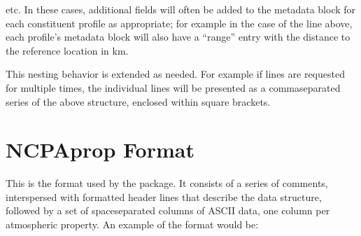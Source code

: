 \documentclass[letterpaper,10pt,english]{sphinxmanual}
\begin{document}
\begin{sphinxVerbatim}[commandchars=\\\{\}]
   
       
       
       
           
           
           
   \PYG{p}{[}
        
        
\end{sphinxVerbatim}

\sphinxAtStartPar
etc.  In these cases, additional fields will often be added to the metadata block for each constituent profile as appropriate; for example in the case of the line above, each profile’s metadata block will also have a “range” entry with the distance to the reference location in km.

\sphinxAtStartPar
This nesting behavior is extended as needed. For example if lines are requested for multiple times, the individual lines will be presented as a comma\sphinxhyphen{}separated series of the above structure, enclosed within square brackets.


\section{NCPAprop Format}
\label{\detokenize{formats:ncpaprop-format}}
\sphinxAtStartPar
This is the format used by the  package.  It consists of a series of comments, interspersed with formatted header lines that describe the data structure, followed by a set of space\sphinxhyphen{}separated columns of ASCII data, one column per atmospheric property.  An example of the format would be:
\end{document}
